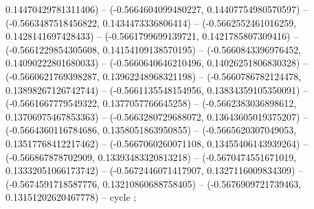 0.14470429781311406) -- (-0.5664604099480227, 0.14407754980570597) -- (-0.5663487518456822, 0.1434473336806414) -- (-0.5662552461016259, 0.1428141697428433) -- (-0.5661799699139721, 0.1421785807309416) -- (-0.5661229854305608, 0.14154109138570195) -- (-0.5660843396976452, 0.14090222801680033) -- (-0.5660640646210496, 0.14026251806830328) -- (-0.5660621769398287, 0.13962248968321198) -- (-0.5660786782124478, 0.13898267126742744) -- (-0.5661135548154956, 0.13834359105350091) -- (-0.5661667779549322, 0.1377057766645258) -- (-0.5662383036898612, 0.13706975467853363) -- (-0.5663280729688072, 0.13643605019375207) -- (-0.5664360116784686, 0.1358051863950855) -- (-0.5665620307049053, 0.13517768412217462) -- (-0.5667060260071108, 0.13455406143939264) -- (-0.566867878702909, 0.13393483320813218) -- (-0.5670474551671019, 0.13332051066173742) -- (-0.5672446071417907, 0.1327116009834309) -- (-0.5674591718587776, 0.13210860688758405) -- (-0.5676909721739463, 0.13151202620467778) -- cycle
;